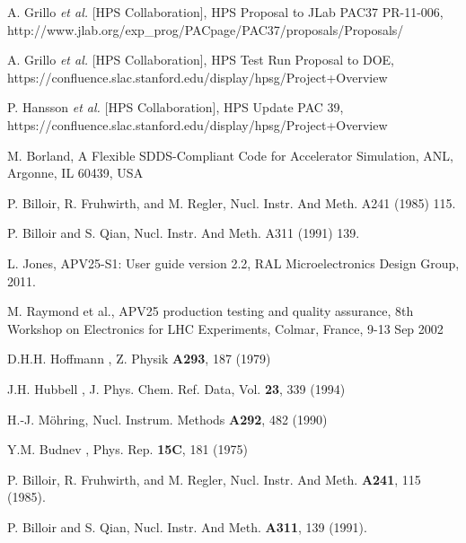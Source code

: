 \begin{thebibliography}{99}


 A. Grillo {\it et al.} [HPS Collaboration], HPS Proposal to JLab PAC37 PR-11-006,
 http://www.jlab.org/exp\_prog/PACpage/PAC37/proposals/Proposals/

 A. Grillo {\it et al.} [HPS Collaboration], HPS Test Run Proposal to DOE, 
https://confluence.slac.stanford.edu/display/hpsg/Project+Overview

 P. Hansson {\it et al.} [HPS Collaboration], HPS Update PAC 39, 
https://confluence.slac.stanford.edu/display/hpsg/Project+Overview



 



 M. Borland, A Flexible SDDS-Compliant Code for Accelerator Simulation, ANL, Argonne, IL 60439, USA
 
 
 P. Billoir, R. Fruhwirth, and M. Regler, Nucl. Instr. And Meth. A241 (1985) 115. 

 P. Billoir and S. Qian, Nucl. Instr. And Meth. A311 (1991) 139. 

 L. Jones, APV25-S1: User guide version 2.2, RAL Microelectronics Design Group, 2011.

 M. Raymond et al., APV25 production testing and quality assurance, 8th Workshop on Electronics for LHC
	              Experiments, Colmar, France, 9-13 Sep 2002

%
D.H.H. Hoffmann \etal, Z. Physik {\bf A293}, 187 (1979)

J.H. Hubbell \etal, J. Phys. Chem. Ref. Data, Vol. {\bf 23}, 339 (1994) 

 H.-J. M\"{o}hring, Nucl. Instrum. Methods {\bf A292}, 482 (1990)

 Y.M. Budnev \etal, Phys. Rep. {\bf 15C}, 181 (1975)

P. Billoir, R. Fruhwirth, and M. Regler, Nucl. Instr. And Meth. {\bf A241}, 115 (1985). 

P. Billoir and S. Qian, Nucl. Instr. And Meth. {\bf A311}, 139 (1991). 



	               


\end{thebibliography} 
